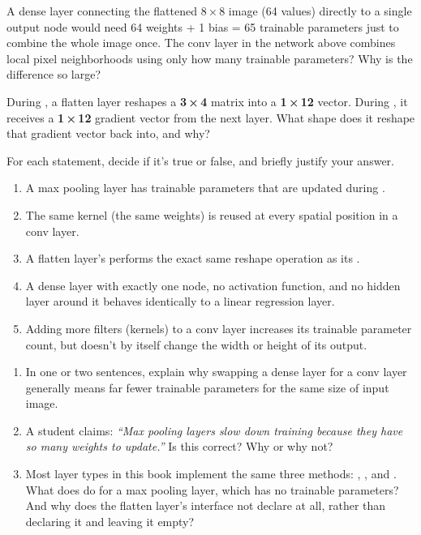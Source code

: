 \label{c10:ex:14}
A dense layer connecting the flattened 8\,×\,8 image (64 values) directly to a single output node
would need 64 weights + 1 bias = 65 trainable parameters just to combine the whole image once. The
conv layer in the network above combines local pixel neighborhoods using only how many trainable
parameters? Why is the difference so large?

\label{c10:ex:15}
During , a flatten layer reshapes a \textbf{3\,×\,4} matrix into a
\textbf{1\,×\,12} vector. During , it receives a \textbf{1\,×\,12} gradient
vector from the next layer. What shape does it reshape that gradient vector back into, and why?

\label{c10:set:6}

\label{c10:ex:16}
For each statement, decide if it's true or false, and briefly justify your answer.
\begin{enumerate}
  \item A max pooling layer has trainable parameters that are updated during .
  \item The same kernel (the same weights) is reused at every spatial position in a conv layer.
  \item A flatten layer's  performs the exact same reshape operation as its
    .
  \item A dense layer with exactly one node, no activation function, and no hidden layer around it
    behaves identically to a linear regression layer.
  \item Adding more filters (kernels) to a conv layer increases its trainable parameter count, but
    doesn't by itself change the width or height of its output.
\end{enumerate}

\label{c10:ex:17}
\begin{enumerate}[start=6]
  \item In one or two sentences, explain why swapping a dense layer for a conv layer generally
    means far fewer trainable parameters for the same size of input image.
  \item A student claims: \emph{``Max pooling layers slow down training because they have so many
    weights to update.''} Is this correct? Why or why not?
  \item Most layer types in this book implement the same three methods: ,
    , and . What does  do for a max pooling
    layer, which has no trainable parameters? And why does the flatten layer's interface not
    declare  at all, rather than declaring it and leaving it empty?
\end{enumerate}

